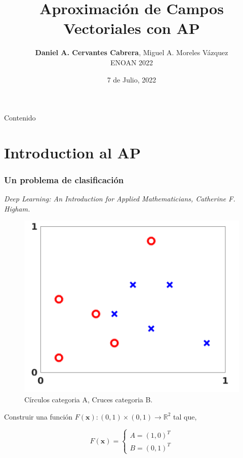 \documentclass[aspectratio=1610]{beamer}
\title{{\huge Aproximación de Campos Vectoriales con AP}}
\author{ \textbf{Daniel A. Cervantes Cabrera}\footfullcite{INFOTEC-CDMX},
        Miguel A. Moreles Vázquez\footfullcite{CIMAT-GTO} \\ ENOAN 2022 }
\date{7 de Julio, 2022}
\begin{document}


\begin{frame}[plain]
  \titlepage
\end{frame}


\begin{frame}{Contenido}
  \tableofcontents

  \end{frame}





\section{Introduction al AP}

\begin{frame}
  \frametitle{Un problema de clasificaci\'on}
\textit{  Deep Learning: An Introduction for Applied Mathematicians, Catherine F. Higham.}
  \begin{figure}[h]
    \centering
    \includegraphics[scale=0.25]{fig}
    \caption{C\'irculos categoria A, Cruces categoria B. }
  \end{figure}
  
  Construir una función $F(\mathbf{x}):(0,1)\times (0,1)\to \mathbb{R}^2$ tal que,
  
  \begin{displaymath}
    F(\mathbf{x}) =
    \begin{cases}
      A = (1,0)^T \\
      B = (0,1)^T
    \end{cases}  
  \end{displaymath}
  
\end{frame}
\end{document}
